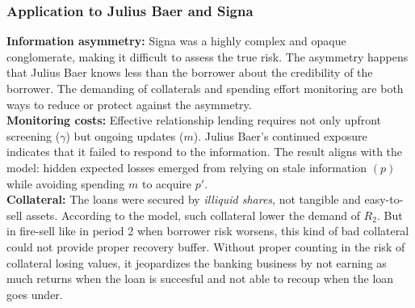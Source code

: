 \subsubsection*{Application to Julius Baer and Signa}
\textbf{Information asymmetry:} Signa was a highly complex and opaque conglomerate, making it difficult to assess the true risk. The asymmetry happens that Julius Baer knows less than the borrower about the credibility of the borrower.  The demanding of collaterals and spending effort monitoring are both ways to reduce or protect against the asymmetry. \\
\textbf{Monitoring costs:} Effective relationship lending requires not only upfront screening ($\gamma$) but ongoing updates ($m$). Julius Baer's continued exposure indicates that it failed to respond to the information. The result aligns with the model: hidden expected losses emerged from relying on stale information $(p)$ while avoiding spending $m$ to acquire $p'$.\\
\textbf{Collateral:} The loans were secured by \emph{illiquid shares}, not tangible and easy-to-sell assets. According to the model, such collateral lower the demand of $R_2$. But in fire-sell like  in period 2 when borrower risk worsens, this kind of bad collateral could not provide proper recovery buffer. Without proper counting in the risk of collateral losing values, it jeopardizes the banking business by not earning as much returns when the loan is succesful and not able to recoup when the loan goes under.